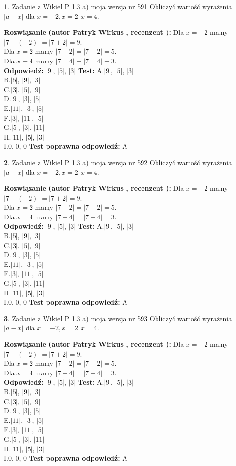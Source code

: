 \documentclass[12pt, a4paper]{article}
\theoremstyle{definition} %
\newtheorem{zad}{}
\newcommand{\zadStart}[1]{\begin{zad}#1\newline}
\newcommand{\zadStop}{\end{zad}}
\newcommand{\rozwStart}[2]{\noindent \textbf{Rozwiązanie (autor #1 , recenzent #2): }\newline}
\newcommand{\rozwStop}{\newline}
\newcommand{\odpStart}{\noindent \textbf{Odpowiedź:}\newline}
\newcommand{\odpStop}{\newline}
\newcommand{\testStart}{\noindent \textbf{Test:}\newline}
\newcommand{\testStop}{\newline}
\newcommand{\kluczStart}{\noindent \textbf{Test poprawna odpowiedź:}\newline}
\newcommand{\kluczStop}{\newline}
\begin{document}
\zadStart{Zadanie z Wikieł P 1.3 a) moja wersja nr 591}
Obliczyć wartość wyrażenia $|a - x|$ dla $x=-2,x=2,x=4$.
\zadStop
\rozwStart{Patryk Wirkus}{}
Dla $x = -2$ mamy $|7 - (-2)| = |7 + 2| = 9$.\\
Dla $x = 2$ mamy $|7 - 2| = |7 - 2| = 5$.\\
Dla $x = 4$ mamy $|7 - 4| = |7 - 4| = 3$.\\
\rozwStop
\odpStart
$|9|$, $|5|$, $|3|$
\odpStop
\testStart
A.$|9|$, $|5|$, $|3|$\\
B.$|5|$, $|9|$, $|3|$\\
C.$|3|$, $|5|$, $|9|$\\
D.$|9|$, $|3|$, $|5|$\\
E.$|11|$, $|3|$, $|5|$\\
F.$|3|$, $|11|$, $|5|$\\
G.$|5|$, $|3|$, $|11|$\\
H.$|11|$, $|5|$, $|3|$\\
I.$0$, $0$, $0$
\testStop
\kluczStart
A
\kluczStop



\zadStart{Zadanie z Wikieł P 1.3 a) moja wersja nr 592}
Obliczyć wartość wyrażenia $|a - x|$ dla $x=-2,x=2,x=4$.
\zadStop
\rozwStart{Patryk Wirkus}{}
Dla $x = -2$ mamy $|7 - (-2)| = |7 + 2| = 9$.\\
Dla $x = 2$ mamy $|7 - 2| = |7 - 2| = 5$.\\
Dla $x = 4$ mamy $|7 - 4| = |7 - 4| = 3$.\\
\rozwStop
\odpStart
$|9|$, $|5|$, $|3|$
\odpStop
\testStart
A.$|9|$, $|5|$, $|3|$\\
B.$|5|$, $|9|$, $|3|$\\
C.$|3|$, $|5|$, $|9|$\\
D.$|9|$, $|3|$, $|5|$\\
E.$|11|$, $|3|$, $|5|$\\
F.$|3|$, $|11|$, $|5|$\\
G.$|5|$, $|3|$, $|11|$\\
H.$|11|$, $|5|$, $|3|$\\
I.$0$, $0$, $0$
\testStop
\kluczStart
A
\kluczStop



\zadStart{Zadanie z Wikieł P 1.3 a) moja wersja nr 593}
Obliczyć wartość wyrażenia $|a - x|$ dla $x=-2,x=2,x=4$.
\zadStop
\rozwStart{Patryk Wirkus}{}
Dla $x = -2$ mamy $|7 - (-2)| = |7 + 2| = 9$.\\
Dla $x = 2$ mamy $|7 - 2| = |7 - 2| = 5$.\\
Dla $x = 4$ mamy $|7 - 4| = |7 - 4| = 3$.\\
\rozwStop
\odpStart
$|9|$, $|5|$, $|3|$
\odpStop
\testStart
A.$|9|$, $|5|$, $|3|$\\
B.$|5|$, $|9|$, $|3|$\\
C.$|3|$, $|5|$, $|9|$\\
D.$|9|$, $|3|$, $|5|$\\
E.$|11|$, $|3|$, $|5|$\\
F.$|3|$, $|11|$, $|5|$\\
G.$|5|$, $|3|$, $|11|$\\
H.$|11|$, $|5|$, $|3|$\\
I.$0$, $0$, $0$
\testStop
\kluczStart
A
\kluczStop
\end{document}
